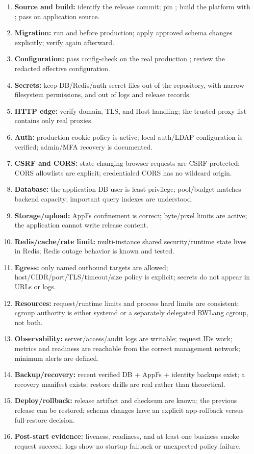 \begin{enumerate}
  \item \textbf{Source and build:} identify the release commit; pin ; build the platform with ; pass  on application source.
  \item \textbf{Migration:} run  and  before production; apply approved schema changes explicitly; verify again afterward.
  \item \textbf{Configuration:} pass config-check on the real production ; review the redacted effective configuration.
  \item \textbf{Secrets:} keep DB/Redis/auth secret files out of the repository, with narrow filesystem permissions, and out of logs and release records.
  \item \textbf{HTTP edge:} verify domain, TLS, and Host handling; the trusted-proxy list contains only real proxies.
  \item \textbf{Auth:} production cookie policy is active; local-auth/LDAP configuration is verified; admin/MFA recovery is documented.
  \item \textbf{CSRF and CORS:} state-changing browser requests are CSRF protected; CORS allowlists are explicit; credentialed CORS has no wildcard origin.
  \item \textbf{Database:} the application DB user is least privilege; pool/budget matches backend capacity; important query indexes are understood.
  \item \textbf{Storage/upload:} AppFs confinement is correct; byte/pixel limits are active; the application cannot write release content.
  \item \textbf{Redis/cache/rate limit:} multi-instance shared security/runtime state lives in Redis; Redis outage behavior is known and tested.
  \item \textbf{Egress:} only named outbound targets are allowed; host/CIDR/port/TLS/timeout/size policy is explicit; secrets do not appear in URLs or logs.
  \item \textbf{Resources:} request/runtime limits and process hard limits are consistent; cgroup authority is either systemd or a separately delegated RWLang cgroup, not both.
  \item \textbf{Observability:} server/access/audit logs are writable; request IDs work; metrics and readiness are reachable from the correct management network; minimum alerts are defined.
  \item \textbf{Backup/recovery:} recent verified DB + AppFs + identity backups exist; a recovery manifest exists; restore drills are real rather than theoretical.
  \item \textbf{Deploy/rollback:} release artifact and checksum are known; the previous release can be restored; schema changes have an explicit app-rollback versus full-restore decision.
  \item \textbf{Post-start evidence:} liveness, readiness, and at least one business smoke request succeed; logs show no startup fallback or unexpected policy failure.
\end{enumerate}

